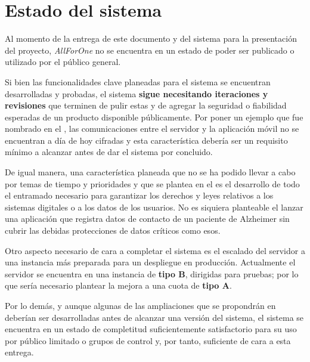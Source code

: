 \chapter{Estado del sistema}
\label{ch:estado_sistema}

Al momento de la entrega de este documento y del sistema para la presentación del proyecto, \emph{AllForOne} no se encuentra en un estado de poder ser publicado o utilizado por el público general.

Si bien las funcionalidades clave planeadas para el sistema se encuentran desarrolladas y probadas, el sistema \textbf{sigue necesitando iteraciones y revisiones} que terminen de pulir estas y de agregar la seguridad o fiabilidad esperadas de un producto disponible públicamente. Por poner un ejemplo que fue nombrado en el , las comunicaciones entre el servidor y la aplicación móvil no se encuentran a día de hoy cifradas y esta característica debería ser un requisito mínimo a alcanzar antes de dar el sistema por concluido.

De igual manera, una característica planeada que no se ha podido llevar a cabo por temas de tiempo y prioridades y que se plantea en el  es el desarrollo de todo el entramado necesario para garantizar los derechos y leyes relativos a los sistemas digitales o a los datos de los usuarios. No es siquiera planteable el lanzar una aplicación que registra datos de contacto de un paciente de Alzheimer sin cubrir las debidas protecciones de datos críticos como esos.

Otro aspecto necesario de cara a completar el sistema es el escalado del servidor a una instancia más preparada para un despliegue en producción. Actualmente el servidor se encuentra en una instancia de \textbf{tipo B}, dirigidas para pruebas; por lo que sería necesario plantear la mejora a una cuota de \textbf{tipo A}.

Por lo demás, y aunque algunas de las ampliaciones que se propondrán en  deberían ser desarrolladas antes de alcanzar una versión  del sistema, el sistema se encuentra en un estado de completitud suficientemente satisfactorio para su uso por público limitado o grupos de control y, por tanto, suficiente de cara a esta entrega.